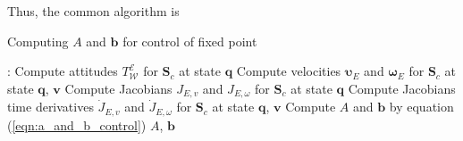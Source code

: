 Thus, the common algorithm is

\begin{breakablealgorithm}
    \caption{Computing $A$ and $\mathbf{b}$ for control of fixed point}

    \begin{algorithmic}[1]
         : 
        \State Compute attitudes $T_{\mathcal{W}}^{\mathcal{E}}$ for $\mathbf{S}_c$ 
        at state $\mathbf{q}$
        \State Compute velocities $\boldsymbol{\upsilon}_E$ and 
        $\boldsymbol{\omega}_E$ for $\mathbf{S}_c$ at state $\mathbf{q}$, 
        $\mathbf{v}$
        \State Compute Jacobians $J_{E,v}$ and $J_{E, \omega}$ for $\mathbf{S}_c$ 
        at state $\mathbf{q}$
        \State Compute Jacobians time derivatives $\dot{J}_{E,v}$ and 
        $\dot{J}_{E, \omega}$ for $\mathbf{S}_c$ at state $\mathbf{q}$, $\mathbf{v}$
        \State Compute $A$ and $\mathbf{b}$ by equation (\ref{eqn:a_and_b_control})
        \State \Return $A$, $\mathbf{b}$
        \EndFunction
    \end{algorithmic}
    \label{alg:get_a_and_b_control_fixed}
\end{breakablealgorithm}
